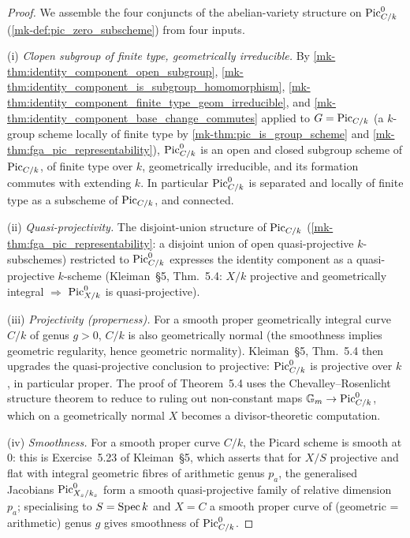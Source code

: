\begin{proof}
  We assemble the four conjuncts of the abelian-variety structure on
  \(\operatorname{Pic}^0_{C/k}\) (\ref{mk-def:pic_zero_subscheme}) from four inputs.

  (i) \emph{Clopen subgroup of finite type, geometrically irreducible.}
  By
  \ref{mk-thm:identity_component_open_subgroup},
  \ref{mk-thm:identity_component_is_subgroup_homomorphism},
  \ref{mk-thm:identity_component_finite_type_geom_irreducible}, and
  \ref{mk-thm:identity_component_base_change_commutes}
  applied to \(G = \operatorname{Pic}_{C/k}\) (a \(k\)-group scheme locally of finite
  type by
  \ref{mk-thm:pic_is_group_scheme} and \ref{mk-thm:fga_pic_representability}),
  \(\operatorname{Pic}^0_{C/k}\) is an open and closed subgroup scheme of \(\operatorname{Pic}_{C/k}\),
  of finite type over \(k\), geometrically irreducible, and its
  formation commutes with extending \(k\). In particular \(\operatorname{Pic}^0_{C/k}\)
  is separated and locally of finite type as a subscheme of
  \(\operatorname{Pic}_{C/k}\), and connected.

  (ii) \emph{Quasi-projectivity.} The disjoint-union structure of
  \(\operatorname{Pic}_{C/k}\) (\ref{mk-thm:fga_pic_representability}: a disjoint union
  of open quasi-projective \(k\)-subschemes) restricted to \(\operatorname{Pic}^0_{C/k}\)
  expresses the identity component as a quasi-projective \(k\)-scheme
  (Kleiman~\S 5, Thm.~5.4: \(X/k\) projective and geometrically
  integral \(\Longrightarrow\) \(\operatorname{Pic}^0_{X/k}\) is quasi-projective).

  (iii) \emph{Projectivity (properness).} For a smooth proper
  geometrically integral curve \(C/k\) of genus \(g > 0\), \(C/k\) is
  also geometrically normal (the smoothness implies geometric
  regularity, hence geometric normality). Kleiman~\S 5, Thm.~5.4
  then upgrades the quasi-projective conclusion to projective:
  \(\operatorname{Pic}^0_{C/k}\) is projective over \(k\), in particular proper.
  The proof of Theorem~5.4 uses the Chevalley--Rosenlicht structure
  theorem to reduce to ruling out non-constant maps
  \(\mathbb G_m \to \operatorname{Pic}^0_{C/k}\), which on a geometrically normal
  \(X\) becomes a divisor-theoretic computation.

  (iv) \emph{Smoothness.} For a smooth proper curve \(C/k\), the
  Picard scheme is smooth at \(0\): this is Exercise~5.23 of
  Kleiman~\S 5, which asserts that for \(X/S\) projective and flat
  with integral geometric fibres of arithmetic genus \(p_a\), the
  generalised Jacobians \(\operatorname{Pic}^0_{X_s/k_s}\) form a smooth
  quasi-projective family of relative dimension \(p_a\); specialising
  to \(S = \operatorname{Spec} k\) and \(X = C\) a smooth proper curve of (geometric
  = arithmetic) genus \(g\) gives smoothness of \(\operatorname{Pic}^0_{C/k}\).


\end{proof}
